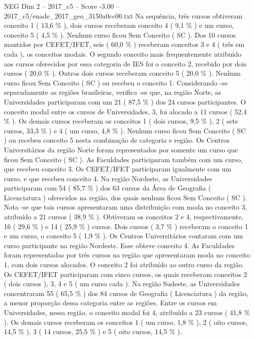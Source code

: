 \begin{textsample}{NEG Dim 2 – 2017\_c5 – Score -3.00 – 2017\_c5/enade\_2017\_geo\_3150a0cc00.txt}
Na sequência, três cursos obtiveram conceito 1 ( 13,6 \% ), dois cursos receberam conceito 4 ( 9,1 \% ) e um curso, conceito 5 ( 4,5 \% ).
Nenhum curso ficou Sem Conceito ( SC ).
Dos 10 cursos mantidos por CEFET/IFET, seis ( 60,0 \% ) receberam conceitos 3 e 4 ( três em cada ), os conceitos modais.
O segundo conceito mais frequentemente atribuído aos cursos oferecidos por essa categoria de IES foi o conceito 2, recebido por dois cursos ( 20,0 \% ).
Outros dois cursos receberam conceito 5 ( 20,0 \% ).
Nenhum curso ficou Sem Conceito ( SC ) ou recebeu o conceito 1.
Considerando -se separadamente as regiões brasileiras, verifica -se que, na região Norte, as Universidades participaram com um 21 ( 87,5 \% ) dos 24 cursos participantes.
O conceito modal entre os cursos de Universidades, 3, foi alocado a 11 cursos ( 52,4 \% ).
Os demais cursos receberam os conceitos 1 ( dois cursos, 9,5 \% ), 2 ( sete cursos, 33,3 \% ) e 4 ( um curso, 4,8 \% ).
Nenhum curso ficou Sem Conceito ( SC ) ou recebeu conceito 5 nesta combinação de categoria e região.
Os Centros Universitários da região Norte foram representados por somente um curso que ficou Sem Conceito ( SC ).
As Faculdades participaram também com um curso, que recebeu conceito 3.
Os CEFET/IFET participaram igualmente com um curso, e que recebeu conceito 4.
Na região Nordeste, as Universidades participaram com 54 ( 85,7 \% ) dos 63 cursos da Área de Geografia ( Licenciatura ) oferecidos na região, dos quais nenhum ficou Sem Conceito ( SC ).
Nota -se que tais cursos apresentaram uma distribuição com moda no conceito 3, atribuído a 21 cursos ( 38,9 \% ).
Obtiveram os conceitos 2 e 4, respectivamente, 16 ( 29,6 \% ) e 14 ( 25,9 \% ) cursos.
Dois cursos ( 3,7 \% ) receberam o conceito 1 e um curso, o conceito 5 ( 1,9 \% ).
Os Centros Universitários contaram com um curso participante na região Nordeste.
Esse obteve conceito 4.
As Faculdades foram representadas por três cursos na região que apresentaram moda no conceito 1, com dois cursos alocados.
O conceito 2 foi atribuído ao outro curso da região.
Os CEFET/IFET participaram com cinco cursos, os quais receberam conceitos 2 ( dois cursos ), 3, 4 e 5 ( um curso cada ).
Na região Sudeste, as Universidades concentraram 55 ( 65,5 \% ) dos 84 cursos de Geografia ( Licenciatura ) da região, a menor proporção dessa categoria entre as regiões.
Entre os cursos em Universidades, nessa região, o conceito modal foi 4, atribuído a 23 cursos ( 41,8 \% ).
Os demais cursos receberam os conceitos 1 ( um curso, 1,8 \% ), 2 ( oito cursos, 14,5 \% ), 3 ( 14 cursos, 25,5 \% ) e 5 ( oito cursos, 14,5 \% ).

\end{textsample}
